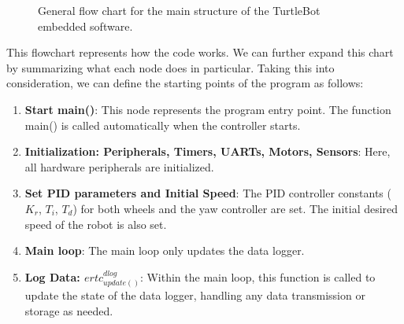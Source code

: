 \documentclass[english]{article}
\begin{document}
\begin{figure}[H]
    \caption{General flow chart for the main structure of the TurtleBot embedded software.}
    \label{fig:flowchart_turtlebot}
\end{figure}

This flowchart represents how the code works. We can further expand this chart by summarizing what each node does in particular. Taking this into consideration, we can define the starting points of the program as follows:
\begin{enumerate}
    \item \textbf{Start main()}: This node represents the program entry point. The function main() is called automatically when the controller starts.\
    \item \textbf{Initialization: Peripherals, Timers, UARTs, Motors, Sensors}: Here, all hardware peripherals are initialized.\
    \item \textbf{Set PID parameters and Initial Speed}: The PID controller constants ($K_r$, $T_i$, $T_d$) for both wheels and the yaw controller are set. The initial desired speed of the robot is also set.\
    \item \textbf{Main loop}: The main loop only updates the data logger.\
    \item \textbf{Log Data: $ertc^{dlog}_{update()}$}: Within the main loop, this function is called to update the state of the data logger, handling any data transmission or storage as needed.\
\end{enumerate}
\end{document}
